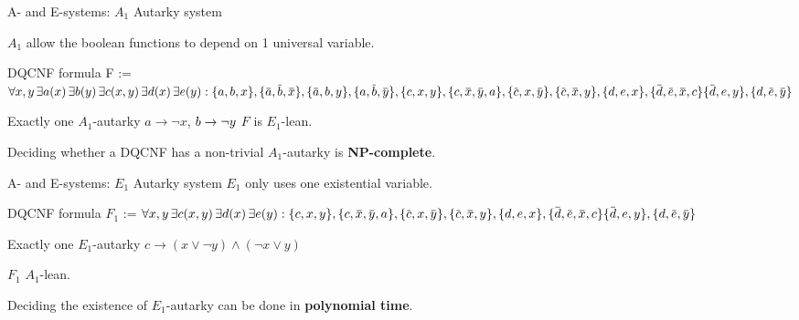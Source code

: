 \documentclass[xcolor=table	]{beamer}
\newcommand{\ov}[1]{\mkern 1.5mu\overline{\mkern-1.5mu#1\mkern-1.5mu}\mkern 1.5mu}
\begin{document}
\begin{frame}{A- and E-systems: $A_1$ Autarky system}

\vspace{0.2cm}
\only
 $A_1$ allow the boolean functions to  
	depend on 1 universal variable. 
	
	\begin{alertblock}{DQCNF formula}
		{		
		F :=	$ \forall x, y \, \exists a(x) \, \exists  b(y) \, \exists c(x,y) \, \exists d(x) \, \exists e(y) :
			\{a,b,x\}, \{\ov{a},\ov{b},\ov{x}\}, \{\ov{a},b,y\}, \{a,\ov{b},\ov{y}\},  \newline 
			\{c,x,y\}, \{c,\ov{x},\ov{y}, a\}, \{\ov{c},x,\ov{y}\}, \{\ov{c},\ov{x},y\}, \newline 
			\{d,e,x\}, \{\ov{d},\ov{e},\ov{x}, c\} \{\ov{d},e,y\}, \{d,\ov{e},\ov{y}\} $
		}
	\end{alertblock}
    
    \begin{example}
    	Exactly one $A_1$-autarky \newline 
    	 $a \to \neg x$, $b \to \neg y \newline$
    	 $F$ is $E_1$-lean.
    \end{example}

Deciding whether a DQCNF has a non-trivial $A_1$-autarky is \textbf{NP-complete}.
\end{frame}
    
\begin{frame}{A- and E-systems: $E_1$ Autarky system}
$E_1$ only uses one existential variable. 
\begin{alertblock}{DQCNF formula}
	{		
		$F_1$ :=	$ \forall x, y \, \exists c(x,y) \, \exists d(x) \, \exists e(y) : \newline 
		\{c,x,y\}, \{c,\ov{x},\ov{y}, a\}, \{\ov{c},x,\ov{y}\}, \{\ov{c},\ov{x},y\}, \newline 
		\{d,e,x\}, \{\ov{d},\ov{e},\ov{x}, c\} \{\ov{d},e,y\}, \{d,\ov{e},\ov{y}\} $
	}
\end{alertblock}

 \begin{example}
	Exactly one $E_1$-autarky \newline 
	$c \to (x \lor \neg y) \land (\neg x \lor y)$
	
	$F_1$ $A_1$-lean.
	
\end{example} 

Deciding the existence of $E_1$-autarky can be done in
\textbf{polynomial time}.
\end{frame}
\end{document}
